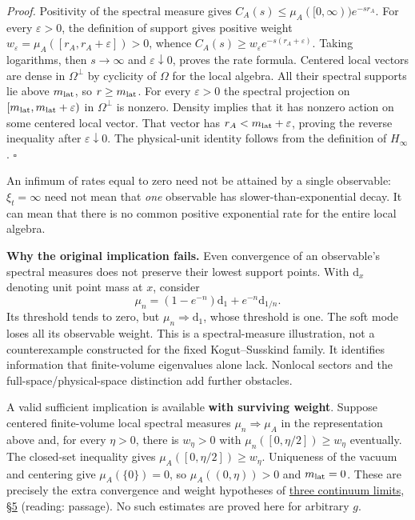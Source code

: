 \documentclass[11pt,a4paper]{article}
\begin{document}
\emph{Proof.} Positivity of the spectral measure gives
\(C_A(s)\le\mu_A([0,\infty))e^{-sr_A}\). For every \(\varepsilon>0\),
the definition of support gives positive weight
\(w_\varepsilon=\mu_A([r_A,r_A+\varepsilon])>0\), whence
\(C_A(s)\ge w_\varepsilon e^{-s(r_A+\varepsilon)}\). Taking logarithms,
then \(s\to\infty\) and \(\varepsilon\downarrow0\), proves the rate
formula. Centered local vectors are dense in \(\Omega^\perp\) by
cyclicity of \(\Omega\) for the local algebra. All their spectral
supports lie above \(m_{\rm lat}\), so \(r\ge m_{\rm lat}\). For every
\(\varepsilon>0\) the spectral projection on
\([m_{\rm lat},m_{\rm lat}+\varepsilon)\) in \(\Omega^\perp\) is
nonzero. Density implies that it has nonzero action on some centered
local vector. That vector has \(r_A<m_{\rm lat}+\varepsilon\), proving
the reverse inequality after \(\varepsilon\downarrow0\). The
physical-unit identity follows from the definition of \(H_\infty\).
\(\square\)

An infimum of rates equal to zero need not be attained by a single
observable: \(\xi_t=\infty\) need not mean that \emph{one} observable
has slower-than-exponential decay. It can mean that there is no common
positive exponential rate for the entire local algebra.

\textbf{Why the original implication fails.} Even convergence of an
observable's spectral measures does not preserve their lowest support
points. With \(\mathrm d_x\) denoting unit point mass at \(x\), consider
\[\mu_n=(1-e^{-n})\mathrm d_1+e^{-n}\mathrm d_{1/n}.
\] Its threshold tends to zero, but \(\mu_n\Rightarrow\mathrm d_1\),
whose threshold is one. The soft mode loses all its observable weight.
This is a spectral-measure illustration, not a counterexample
constructed for the fixed Kogut--Susskind family. It identifies
information that finite-volume eigenvalues alone lack. Nonlocal sectors
and the full-space/physical-space distinction add further obstacles.

A valid sufficient implication is available \textbf{with surviving
weight}. Suppose centered finite-volume local spectral measures
\(\mu_n\Rightarrow\mu_A\) in the representation above and, for every
\(\eta>0\), there is \(w_\eta>0\) with \(\mu_n([0,\eta/2])\ge w_\eta\)
eventually. The closed-set inequality gives
\(\mu_A([0,\eta/2])\ge w_\eta\). Uniqueness of the vacuum and centering
give \(\mu_A(\{0\})=0\), so \(\mu_A((0,\eta))>0\) and \(m_{\rm lat}=0\).
These are precisely the extra convergence and weight hypotheses of
\href{three-continuum-limits.md}{three continuum limits, §5} (reading:
passage). No such estimates are proved here for arbitrary \(g\).
\end{document}

